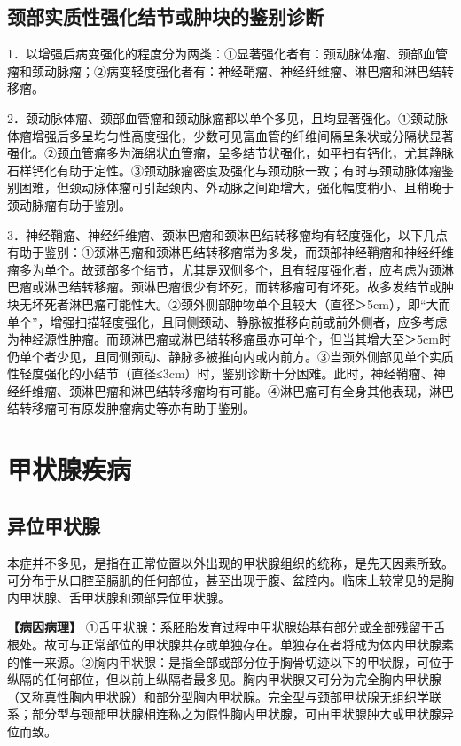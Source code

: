 \subsection{颈部实质性强化结节或肿块的鉴别诊断}

1．以增强后病变强化的程度分为两类：①显著强化者有：颈动脉体瘤、颈部血管瘤和颈动脉瘤；②病变轻度强化者有：神经鞘瘤、神经纤维瘤、淋巴瘤和淋巴结转移瘤。

2．颈动脉体瘤、颈部血管瘤和颈动脉瘤都以单个多见，且均显著强化。①颈动脉体瘤增强后多呈均匀性高度强化，少数可见富血管的纤维间隔呈条状或分隔状显著强化。②颈血管瘤多为海绵状血管瘤，呈多结节状强化，如平扫有钙化，尤其静脉石样钙化有助于定性。③颈动脉瘤密度及强化与颈动脉一致；有时与颈动脉体瘤鉴别困难，但颈动脉体瘤可引起颈内、外动脉之间距增大，强化幅度稍小、且稍晚于颈动脉瘤有助于鉴别。

3．神经鞘瘤、神经纤维瘤、颈淋巴瘤和颈淋巴结转移瘤均有轻度强化，以下几点有助于鉴别：①颈淋巴瘤和颈淋巴结转移瘤常为多发，而颈部神经鞘瘤和神经纤维瘤多为单个。故颈部多个结节，尤其是双侧多个，且有轻度强化者，应考虑为颈淋巴瘤或淋巴结转移瘤。颈淋巴瘤很少有坏死，而转移瘤可有坏死。故多发结节或肿块无坏死者淋巴瘤可能性大。②颈外侧部肿物单个且较大（直径＞5cm），即“大而单个”，增强扫描轻度强化，且同侧颈动、静脉被推移向前或前外侧者，应多考虑为神经源性肿瘤。而颈淋巴瘤或淋巴结转移瘤虽亦可单个，但当其增大至＞5cm时仍单个者少见，且同侧颈动、静脉多被推向内或内前方。③当颈外侧部见单个实质性轻度强化的小结节（直径≤3cm）时，鉴别诊断十分困难。此时，神经鞘瘤、神经纤维瘤、颈淋巴瘤和淋巴结转移瘤均有可能。④淋巴瘤可有全身其他表现，淋巴结转移瘤可有原发肿瘤病史等亦有助于鉴别。

\section{甲状腺疾病}

\subsection{异位甲状腺}

本症并不多见，是指在正常位置以外出现的甲状腺组织的统称，是先天因素所致。可分布于从口腔至膈肌的任何部位，甚至出现于腹、盆腔内。临床上较常见的是胸内甲状腺、舌甲状腺和颈部异位甲状腺。

\textbf{【病因病理】}
①舌甲状腺：系胚胎发育过程中甲状腺始基有部分或全部残留于舌根处。故可与正常部位的甲状腺共存或单独存在。单独存在者将成为体内甲状腺素的惟一来源。②胸内甲状腺：是指全部或部分位于胸骨切迹以下的甲状腺，可位于纵隔的任何部位，但以前上纵隔者最多见。胸内甲状腺又可分为完全胸内甲状腺（又称真性胸内甲状腺）和部分型胸内甲状腺。完全型与颈部甲状腺无组织学联系；部分型与颈部甲状腺相连称之为假性胸内甲状腺，可由甲状腺肿大或甲状腺异位而致。

